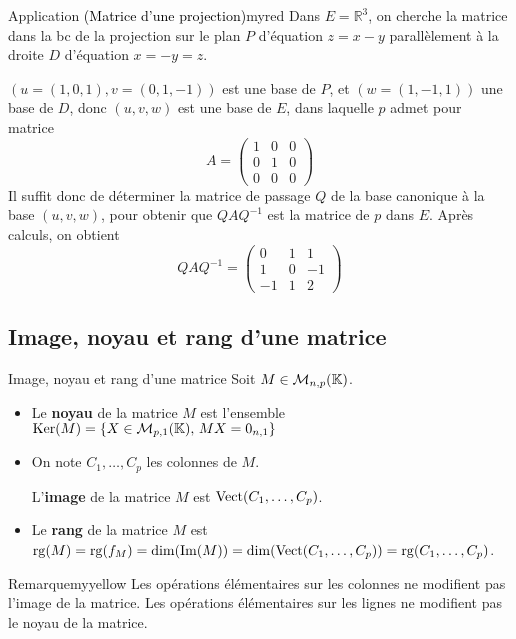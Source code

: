     \begin{omed}{Application \textcolor{black}{(Matrice d’une projection)}}{myred}
        Dans $E = \mathbb{R}^3$, on cherche la matrice dans la bc de la projection sur le plan $P$ d’équation $z = x-y$ parallèlement à la droite $D$ d’équation $x = -y = z$.

        $(u = (1,0,1), v = (0,1,-1))$ est une base de $P$, et $(w = (1,-1,1))$ une base de $D$, donc $(u,v,w)$ est une base de $E$, dans laquelle $p$ admet pour matrice 
        \[ A = \left(\begin{array}{ccc}
            1&0&0\\
            0&1&0\\
            0&0&0
            \end{array}\right) \]
        Il suffit donc de déterminer la matrice de passage $Q$ de la base canonique à la base $(u,v,w)$, pour obtenir que $Q A Q^{-1}$ est la matrice de $p$ dans $E$. Après calculs, on obtient 
        \[ QAQ^{-1}=\left(
            \begin{array}{ccc}
            0&1&1\\
            1&0&-1\\
            -1&1&2
            \end{array}
            \right) \]   
    \end{omed}

\subsection{Image, noyau et rang d’une matrice}

    \begin{defi}{Image, noyau et rang d’une matrice}{}
        Soit $M \in \mathcal{M}_{n,p}(\mathbb{K})$.
        \begin{itemize}
            \item Le \textbf{noyau} de la matrice $M$ est l’ensemble $\operatorname{Ker}(M)=\left\{ X \in \mathcal{M}_{p,1}(\mathbb{K}), \, MX=0_{n,1} \right\}$
            \item On note $C_1, \ldots, C_p$ les colonnes de $M$.

            L’\textbf{image} de la matrice $M$ est $\operatorname{Vect}(C_1, \ldots, C_p)$.
            \item Le \textbf{rang} de la matrice $M$ est $\operatorname{rg}(M) = \operatorname{rg}(f_M)=\dim(\operatorname{Im}(M)) = \dim(\operatorname{Vect}(C_1,\ldots,C_p)) = \operatorname{rg}(C_1, \ldots, C_p)$. 
        \end{itemize}
    \end{defi}

    \begin{omed}{Remarque}{myyellow}
        Les opérations élémentaires sur les colonnes ne modifient pas l’image de la matrice.
        Les opérations élémentaires sur les lignes ne modifient pas le noyau de la matrice.
    \end{omed}

